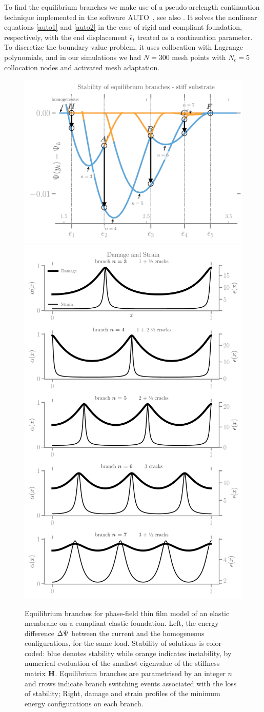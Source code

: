 \documentclass[10pt]{article}
\begin{document}
To find the equilibrium branches we make use of a pseudo-arclength continuation technique implemented in the software AUTO~\cite{Doedel1981-sa}, see also \cite{Pattamatta2014-pn}. It solves the nonlinear equations \ref{auto1} and \ref{auto2} in the case of rigid and compliant foundation, respectively, with the end displacement $\bar\epsilon_t$ treated as a continuation parameter. To discretize the boundary-value problem, it uses collocation with Lagrange polynomials, and in our simulations we had $N=300$ mesh points with $N_c = 5$ collocation nodes and activated mesh adaptation. 
\begin{figure}
\centering
    \hspace*{-.3cm}
%
\includegraphics[align=c, width=.6\textwidth]{../images/model_stiff_energy.pdf}
\includegraphics[align=c, width=.4\textwidth]{../images/model_stiff_fields.pdf}
    \caption{
%
Equilibrium branches for phase-field thin film model of an elastic membrane on a compliant elastic foundation. Left, the energy difference $\Delta \Psi$ between the current and the homogeneous configurations, for the same load. Stability of solutions is color-coded: blue denotes stability while orange indicates instability, by numerical evaluation of the smallest eigenvalue of the stiffness matrix $\mathbf{H}$. Equilibrium branches are parametrised by an integer $n$ and rrows indicate branch switching events associated with the loss of stability; Right, damage and strain profiles of the minimum energy configurations on each branch.}
    \label{fig:branches-stiff}
\end{figure}
\end{document}
